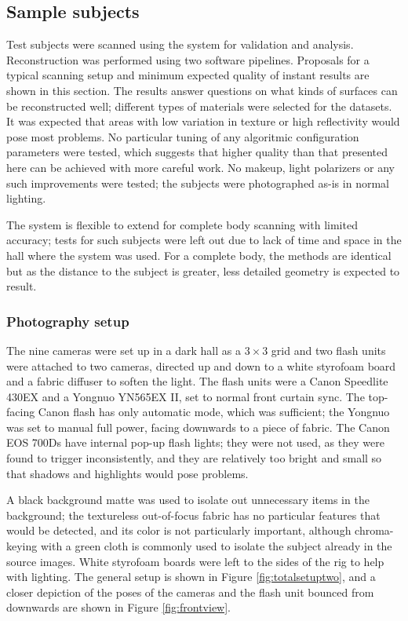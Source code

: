 \subsection{Sample subjects} \label{sec:samplesubjects}

Test subjects were scanned using the system for validation and analysis.
Reconstruction was performed using two software pipelines.
Proposals for a typical scanning setup and minimum expected quality of instant results are shown in this section.
The results answer questions on what kinds of surfaces can be reconstructed well; different types of materials were selected for the datasets.
It was expected that areas with low variation in texture or high reflectivity would pose most problems.
No particular tuning of any algoritmic configuration parameters were tested, which suggests that higher quality than that presented here can be achieved with more careful work.
No makeup, light polarizers or any such improvements were tested; the subjects were photographed as-is in normal lighting.

The system is flexible to extend for complete body scanning with limited accuracy; tests for such subjects were left out due to lack of time and space in the hall where the system was used.
For a complete body, the methods are identical but as the distance to the subject is greater, less detailed geometry is expected to result.

\subsubsection{Photography setup}

The nine cameras were set up in a dark hall as a $3 \times 3$ grid and two flash units were attached to two cameras, directed up and down to a white styrofoam board and a fabric diffuser to soften the light.
The flash units were a Canon Speedlite 430EX and a Yongnuo YN565EX II, set to normal front curtain sync.
The top-facing Canon flash has only automatic mode, which was sufficient; the Yongnuo was set to manual full power, facing downwards to a piece of fabric.
The Canon EOS 700Ds have internal pop-up flash lights; they were not used, as they were found to trigger inconsistently, and they are relatively too bright and small so that shadows and highlights would pose problems.

A black background matte was used to isolate out unnecessary items in the background;
the textureless out-of-focus fabric has no particular features that would be detected, and its color is not particularly important, although chroma-keying with a green cloth is commonly used to isolate the subject already in the source images.
White styrofoam boards were left to the sides of the rig to help with lighting.
The general setup is shown in Figure \ref{fig:totalsetuptwo}, and a closer depiction of the poses of the cameras and the flash unit bounced from downwards are shown in Figure \ref{fig:frontview}.

